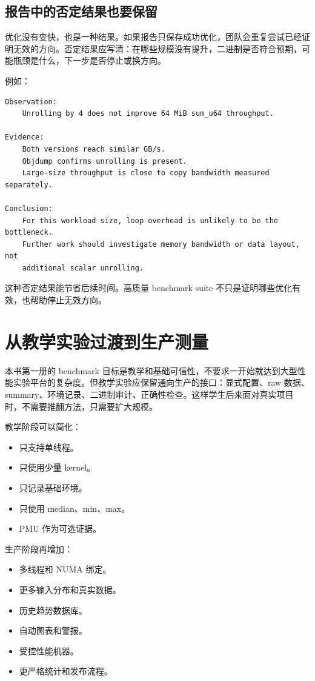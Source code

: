 \subsection{报告中的否定结果也要保留}

优化没有变快，也是一种结果。如果报告只保存成功优化，团队会重复尝试已经证明无效的方向。否定结果应写清：在哪些规模没有提升，二进制是否符合预期，可能瓶颈是什么，下一步是否停止或换方向。

例如：

\begin{lstlisting}
Observation:
    Unrolling by 4 does not improve 64 MiB sum_u64 throughput.

Evidence:
    Both versions reach similar GB/s.
    Objdump confirms unrolling is present.
    Large-size throughput is close to copy bandwidth measured separately.

Conclusion:
    For this workload size, loop overhead is unlikely to be the bottleneck.
    Further work should investigate memory bandwidth or data layout, not
    additional scalar unrolling.
\end{lstlisting}

这种否定结果能节省后续时间。高质量 benchmark suite 不只是证明哪些优化有效，也帮助停止无效方向。

\section{从教学实验过渡到生产测量}

本书第一册的 benchmark 目标是教学和基础可信性，不要求一开始就达到大型性能实验平台的复杂度。但教学实验应保留通向生产的接口：显式配置、raw 数据、summary、环境记录、二进制审计、正确性检查。这样学生后来面对真实项目时，不需要推翻方法，只需要扩大规模。

教学阶段可以简化：

\begin{itemize}
  \item 只支持单线程。
  \item 只使用少量 kernel。
  \item 只记录基础环境。
  \item 只使用 median、min、max。
  \item PMU 作为可选证据。
\end{itemize}

生产阶段再增加：

\begin{itemize}
  \item 多线程和 NUMA 绑定。
  \item 更多输入分布和真实数据。
  \item 历史趋势数据库。
  \item 自动图表和警报。
  \item 受控性能机器。
  \item 更严格统计和发布流程。
\end{itemize}

